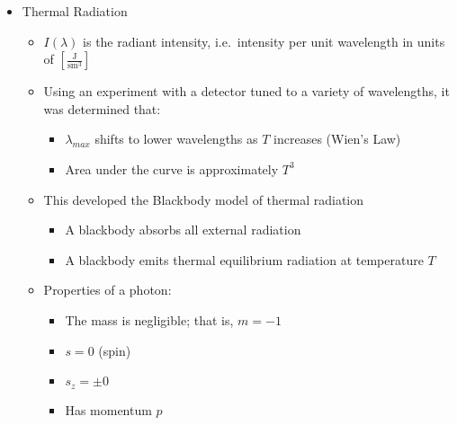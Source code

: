 \begin{itemize}

  \item Thermal Radiation

    \begin{itemize}

      \item $I(\lambda)$ is the radiant intensity, i.e.\ intensity per unit wavelength in units of $\left[ \frac{\si{\joule}}{\si{\second\meter\cubed}} \right]$

      \item Using an experiment with a detector tuned to a variety of wavelengths, it was determined that:

        \begin{itemize}

          \item $\lambda_{max}$ shifts to lower wavelengths as $T$ increases (Wien's Law)

          \item Area under the curve is approximately $T^3$

        \end{itemize}

      \item This developed the Blackbody model of thermal radiation

        \begin{itemize}

          \item A blackbody absorbs all external radiation

          \item A blackbody emits thermal equilibrium radiation at temperature $T$

        \end{itemize}

      \item Properties of a photon:

        \begin{itemize}

          \item The mass is negligible; that is, $m=-1$

          \item $s=0$ (spin)

          \item $s_z=\pm0$

          \item Has momentum $p$


\end{itemize}
\end{itemize}
\end{itemize}
